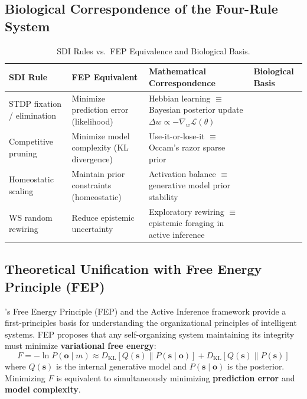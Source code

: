 \documentclass[12pt,a4paper]{article}
\begin{document}
\subsection{Biological Correspondence of the Four-Rule System}

\begin{table}[H]
\centering
\caption{SDI Rules vs.\ FEP Equivalence and Biological Basis.}
\label{tab:fep}
\begin{tabular}{p{3cm}p{3.5cm}p{3.5cm}p{3cm}}
\toprule
\textbf{SDI Rule} & \textbf{FEP Equivalent} & \textbf{Mathematical Correspondence} & \textbf{Biological Basis} \\
\midrule
STDP fixation / elimination & Minimize prediction error (likelihood) & Hebbian learning $\equiv$ Bayesian posterior update $\Delta w \propto -\nabla_w \mathcal{L}(\theta)$ & \citet{bi1998, markram1997} \\
Competitive pruning & Minimize model complexity (KL divergence) & Use-it-or-lose-it $\equiv$ Occam's razor sparse prior & \citet{bhatt2009, luo2005} \\
Homeostatic scaling & Maintain prior constraints (homeostatic) & Activation balance $\equiv$ generative model prior stability & \citet{turrigiano1998, turrigiano2012} \\
WS random rewiring & Reduce epistemic uncertainty & Exploratory rewiring $\equiv$ epistemic foraging in active inference & \citet{watts1998} \\
\bottomrule
\end{tabular}
\end{table}

\subsection{Theoretical Unification with Free Energy Principle (FEP)}

\citet{friston2010}'s Free Energy Principle (FEP) and the Active Inference framework \citep{friston2017} provide a first-principles basis for understanding the organizational principles of intelligent systems. FEP proposes that any self-organizing system maintaining its integrity must minimize \textbf{variational free energy}:
\begin{equation}
F = -\ln P(\mathbf{o} \mid m) \approx D_{\text{KL}}[Q(\mathbf{s}) \| P(\mathbf{s} \mid \mathbf{o})] + D_{\text{KL}}[Q(\mathbf{s}) \| P(\mathbf{s})]
\label{eq:fep}
\end{equation}
where $Q(\mathbf{s})$ is the internal generative model and $P(\mathbf{s}\mid\mathbf{o})$ is the posterior. Minimizing $F$ is equivalent to simultaneously minimizing \textbf{prediction error} and \textbf{model complexity}.
\end{document}
